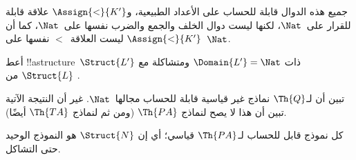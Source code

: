 \documentclass[../../../include/open-logic-section]{subfiles}
\begin{document}
\begin{ex}
جميع هذه الدوال قابلة للحساب على الأعداد الطبيعية، و$\Assign{<}{K'}$
علاقة قابلة للقرار على~$\Nat$، لكنها ليست دوال الخلف والجمع والضرب نفسها
على~$\Nat$، كما أن $\Assign{<}{K'}$ ليست العلاقة~$<$ نفسها على~$\Nat$.
\end{ex}

\begin{prob}
أعط !!a{structure}~$\Struct{L'}$ ذات $\Domain{L'}=\Nat$ ومتشاكلة مع
$\Struct{L}$ من .
\end{prob}

\begin{explain}
تبين  أن لـ$\Th{Q}$ نماذج غير قياسية قابلة
للحساب مجالها~$\Nat$. غير أن النتيجة الآتية تبين أن هذا لا يصح لنماذج
$\Th{PA}$ (ومن ثم لنماذج $\Th{TA}$ أيضًا).
\end{explain}

\begin{thm}
كل نموذج قابل للحساب لـ$\Th{PA}$ قياسي؛ أي إن $\Struct{N}$ هو النموذج
الوحيد حتى التشاكل.
\end{thm}
\end{document}
